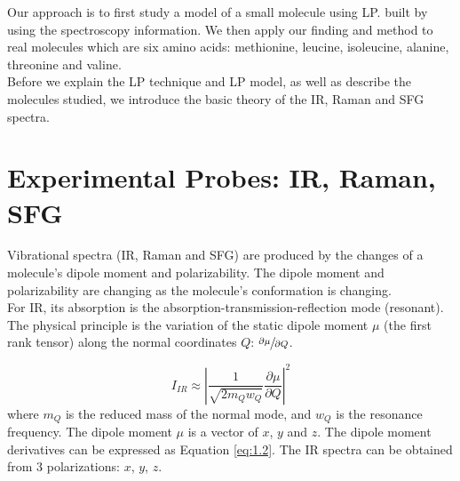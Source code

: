 Our approach is to first study a model of a small molecule using LP. built by using the spectroscopy information. We then apply our finding and method to real molecules which are six amino acids: methionine, leucine, isoleucine, alanine, threonine and valine.\\

Before we explain the LP technique and LP model, as well as describe the molecules studied, we introduce the basic theory of  the IR, Raman and SFG spectra.\\

\section{Experimental Probes: IR, Raman, SFG}
Vibrational spectra (IR, Raman and SFG) are produced by the changes of a molecule's dipole moment and polarizability. The dipole moment and polarizability are changing as the molecule's conformation is changing. \\

For IR, its absorption is the absorption-transmission-reflection mode (resonant). The physical principle is the variation of the static dipole moment $\mu$ (the first rank tensor) along the normal coordinates $Q$: $\sfrac{\partial\mu}{\partial Q}$. 

\begin{equation} \label{eq:1.1}
I_{IR} \approx \left| \frac{1}{\sqrt{2m_{Q}w_{Q}}} \frac{\partial\mu}{\partial Q} \right|^{2}
\end{equation}
where $m_{Q}$ is the reduced mass of the normal mode, and $w_{Q}$ is the resonance frequency. The dipole moment $\mu$ is a vector of $x$, $y$ and $z$. The dipole moment derivatives can be expressed as Equation \ref{eq:1.2}. The IR spectra can be obtained from 3 polarizations: $x$, $y$, $z$. 


